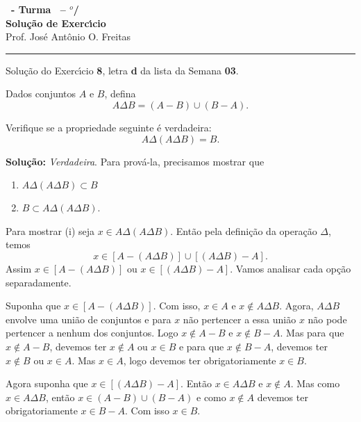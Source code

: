 \documentclass[12pt]{exam}
\begin{document}
    \begin{center}
        {\Large\bf \disciplina\ - Turma \turma\ -- \semestre$^{o}$/\ano} \\ \vspace{9pt} {\large\bf
        Solu\c{c}\~ao de Exerc{\'\i}cio}\\
        \vspace{9pt} Prof. Jos{\'e} Ant{\^o}nio O. Freitas
    \end{center}
    \hrule

    \vspace{.6cm}

    Solu\c{c}\~ao do Exerc{\'\i}cio \textbf{8}, letra \textbf{d} da lista da Semana \textbf{03}.

    \vspace{.6cm}

    \questao{} Dados conjuntos $A$ e $B$, defina
    \[
        A \Delta B = (A - B) \cup (B - A).
    \]

    Verifique se a propriedade seguinte \'e verdadeira:    
    \[
        A \Delta (A \Delta B) = B.
    \]


    \noindent\textbf{Solu\c{c}\~ao:} \textit{Verdadeira}. Para prov\'a-la, precisamos mostrar que
    \begin{enumerate}[label=({\roman*})]
        \item $A \Delta (A \Delta B) \subset B$
        \item $B \subset A \Delta (A \Delta B)$.
    \end{enumerate}

    Para mostrar (i)  seja $x \in A \Delta (A \Delta B)$. Ent\~ao pela defini\c{c}\~ao da opera\c{c}\~ao $\Delta$, temos
    \[
        x \in [A - (A \Delta B)] \cup [(A \Delta B) - A].
    \]
    Assim $x \in [A - (A \Delta B)]$ ou $x \in [(A \Delta B) - A]$. Vamos analisar cada op\c{c}\~ao separadamente.

    Suponha que $x \in [A - (A \Delta B)]$. Com isso, $x \in A$ e $x \notin A \Delta B$. Agora, $A \Delta B$ envolve uma uni\~ao de conjuntos e para $x$ n\~ao pertencer a essa uni\~ao $x$ n\~ao pode pertencer a nenhum dos conjuntos. Logo $x \notin A - B$ e $x \notin B - A$. Mas para que $x \notin A - B$, devemos ter $x \notin A$ ou $x \in B$ e para que $x \notin B - A$, devemos ter $x \notin B$ ou $x \in A$. Mas $x \in A$, logo devemos ter obrigatoriamente $x \in B$.

    Agora suponha que $x \in [(A \Delta B) - A]$. Ent\~ao $x \in A \Delta B$ e $x \notin A$. Mas como $x \in A \Delta B$, ent\~ao $x \in (A - B) \cup (B - A)$ e como $x \notin A$ devemos ter obrigatoriamente $x \in B - A$. Com isso $x \in B$.
\end{document}
